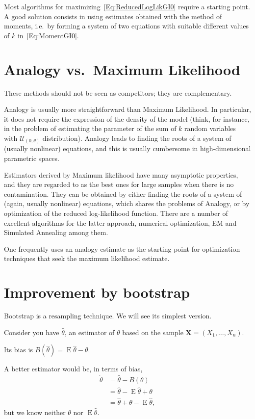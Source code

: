 Most algorithms for maximizing~\eqref{Eq:ReducedLogLikGI0} require a starting point.
A good solution consists in using estimates obtained with the method of moments, i.e.\ by forming a system of two equations with suitable different values of $k$ in~\eqref{Eq:MomentGI0}.

\section{Analogy vs.\ Maximum Likelihood}

These methods should not be seen as competitors; they are complementary.

Analogy is usually more straightforward than Maximum Likelihood.
In particular, it does not require the expression of the density of the model (think, for instance, in the problem of estimating the parameter of the sum of $k$ random variables with $\mathcal U_{(0,\theta)}$ distribution).
Analogy leads to finding the roots of a system of (usually nonlinear) equations, and this is usually cumbersome in high-dimensional parametric spaces.

Estimators derived by Maximum likelihood have many asymptotic properties, and they are regarded to as the best ones for large samples when there is no contamination.
They can be obtained by either finding the roots of a system of (again, usually nonlinear) equations, which shares the problems of Analogy, or by optimization of the reduced log-likelihood function.
There are a number of excellent algorithms for the latter approach, numerical optimization\cite{maxLik}, EM and Simulated Annealing among them.

One frequently uses an analogy estimate as the starting point for optimization techniques that seek the maximum likelihood estimate.

\section{Improvement by bootstrap}

Bootstrap is a resampling technique.
We will see its simplest version.

Consider you have $\widehat{\theta}$, an estimator of $\theta$ based on the sample $\bm X=(X_1,\dots,X_n)$.

Its bias is $B(\widehat{\theta})=\operatorname{E}\widehat{\theta}-\theta$.

A better estimator would be, in terms of bias,
\begin{align}
\dot{\theta}	&=\widehat{\theta}-B(\theta)\\
				&=\widehat{\theta}- \operatorname{E}\widehat{\theta}+\theta\nonumber\\
				&=\widehat{\theta}+\theta-\operatorname{E}\widehat{\theta},
\end{align}
but we know neither $\theta$ nor $\operatorname{E}\widehat{\theta}$.

